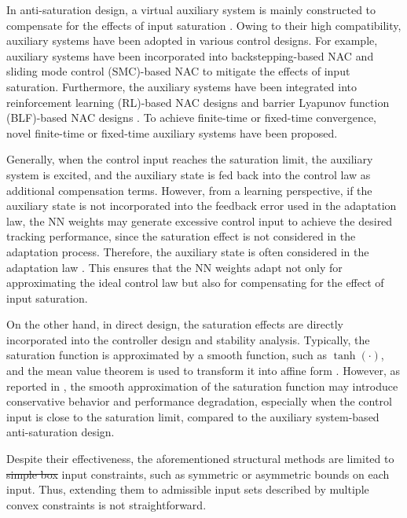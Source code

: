 \documentclass[letterpaper, journal, twoside]{IEEEtran}
\providecommand{\DIFadd}[1]{{\protect\color{blue}\uwave{#1}}} %
\providecommand{\DIFdel}[1]{{\protect\color{red}\sout{#1}}} %
\providecommand{\DIFaddbegin}{} %
\providecommand{\DIFaddend}{} %
\providecommand{\DIFdelbegin}{} %
\providecommand{\DIFdelend}{} %
\begin{document}
In anti-saturation design, a virtual auxiliary system is mainly constructed to compensate for the effects of input saturation \cite{Ma:2025aa,Gao:2026aa,Yang:2021aa,Jia:2020aa,Liu:2024aa,Liu:2025aa,Gao:2017aa,Esfandiari:2014aa,Esfandiari:2015aa,Yu:2022aa,Rezaei:2025aa,He:2016aa,He:2019aa,Zhao:2016aa,Peng:2020aa}.
Owing to their high compatibility, auxiliary systems have been adopted in various control designs.
For example, auxiliary systems have been incorporated into backstepping-based NAC \cite{Gao:2017aa} and sliding mode control (SMC)-based NAC \cite{Ma:2025aa} to mitigate the effects of input saturation.
Furthermore, the auxiliary systems have been integrated into reinforcement learning (RL)-based NAC designs \cite{Gao:2026aa} and barrier Lyapunov function (BLF)-based NAC designs \cite{Yang:2021aa}.
To achieve finite-time or fixed-time convergence, novel finite-time \cite{Jia:2020aa} or fixed-time \cite{Liu:2024aa,Liu:2025aa} auxiliary systems have been proposed.

Generally, when the control input reaches the saturation limit, the auxiliary system is excited, and the auxiliary state is fed back into the control law as additional compensation terms.
However, from a learning perspective, if the auxiliary state is not incorporated into the feedback error used in the adaptation law, the NN weights may generate excessive control input to achieve the desired tracking performance, since the saturation effect is not considered in the adaptation process.
Therefore, the auxiliary state is often considered in the adaptation law \cite{Gao:2017aa,Esfandiari:2014aa,Esfandiari:2015aa,Liu:2024aa,Liu:2025aa,Yu:2022aa,Rezaei:2025aa}.
This ensures that the NN weights adapt not only for approximating the ideal control law but also for compensating for the effect of input saturation.

On the other hand, in direct design, the saturation effects are directly incorporated into the controller design and stability analysis.
Typically, the saturation function is approximated by a smooth function, such as $\tanh(\cdot)$, and the mean value theorem is used to transform it into affine form \cite{Wang:2013aa,Cui:2014aa,Li:2024aa}.
However, as reported in \cite{Min:2021aa}, the smooth approximation of the saturation function may introduce conservative behavior and performance degradation, especially when the control input is close to the saturation limit, compared to the auxiliary system-based anti-saturation design.

Despite their effectiveness, the aforementioned structural methods are limited to \DIFdelbegin \DIFdel{simple box }\DIFdelend \DIFaddbegin \DIFadd{element-wise }\DIFaddend input constraints, such as symmetric or asymmetric bounds on each input.
Thus, extending them to admissible input sets described by multiple convex constraints is not straightforward.
\end{document}
